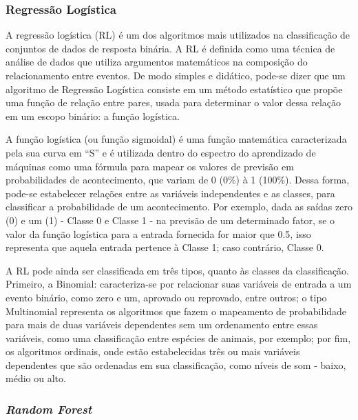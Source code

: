 \documentclass[tcc2]{uftex}
\begin{document}
\subsubsection{Regressão Logística}

A regressão logística (RL) é um dos algoritmos mais utilizados na classificação de conjuntos de dados de resposta binária. A RL é definida como uma técnica de análise de dados que utiliza argumentos matemáticos na composição do relacionamento entre eventos. De modo simples e didático, pode-se dizer que um algoritmo de Regressão Logística consiste em um método estatístico que propõe uma função de relação entre pares, usada para determinar o valor dessa relação em um escopo binário: a função logística.

A função logística (ou função sigmoidal) é uma função matemática caracterizada pela sua curva em ``S'' e é utilizada dentro do espectro do aprendizado de máquinas como uma fórmula para mapear os valores de previsão em probabilidades de acontecimento, que variam de 0 (0\%) à 1 (100\%). Dessa forma, pode-se estabelecer relações entre as variáveis independentes e as classes, para classificar a probabilidade de um acontecimento. Por exemplo, dada as saídas zero (0) e um (1) - Classe 0 e Classe 1 -  na previsão de um determinado fator, se o valor da função logística para a entrada fornecida for maior que 0.5, isso representa que aquela entrada pertence à Classe 1; caso contrário, Classe 0.

A RL pode ainda ser classificada em três tipos, quanto às classes da classificação. Primeiro, a Binomial: caracteriza-se por relacionar suas variáveis de entrada a um evento binário, como zero e um, aprovado ou reprovado, entre outros; o tipo Multinomial representa os algoritmos que fazem o mapeamento de probabilidade para mais de duas variáveis dependentes sem um ordenamento entre essas variáveis, como uma classificação entre espécies de animais, por exemplo; por fim, os algoritmos ordinais, onde estão estabelecidas três ou mais variáveis dependentes que são ordenadas em sua classificação, como níveis de som - baixo, médio ou alto.

\subsubsection{ \textit{Random Forest}}
\end{document}
